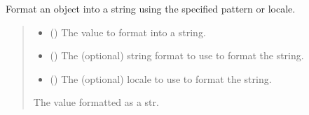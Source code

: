 \documentclass[letterpaper,10pt,english]{sphinxmanual}
\begin{document}
\begin{fulllineitems}
\begin{fulllineitems}
\begin{quote}
\begin{description}
\end{description}\end{quote}

\end{fulllineitems}


\begin{fulllineitems}
\label{\detokenize{apache_commons_validator_python.routines:apache_commons_validator_python.routines.abstract_number_validator.AbstractNumberValidator.format}}
\pysigstartsignatures
{}
\pysigstopsignatures
\sphinxAtStartPar
Format an object into a string using the specified pattern or locale.
\begin{quote}\begin{description}
\begin{itemize}
\item {} 
\sphinxAtStartPar
{} () \textendash{} The value to format into a string.

\item {} 
\sphinxAtStartPar
{} () \textendash{} The (optional) string format to use to format the string.

\item {} 
\sphinxAtStartPar
{} () \textendash{} The (optional) locale to use to format the string.

\end{itemize}

\sphinxAtStartPar
The value formatted as a str.


\end{description}
\end{quote}
\end{fulllineitems}
\end{fulllineitems}
\end{document}
